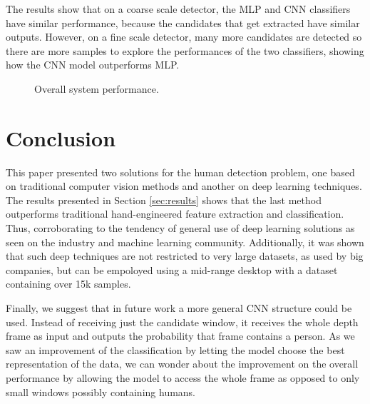    The results show that on a coarse scale detector, the MLP and CNN classifiers have similar performance, because the candidates that get extracted have similar outputs. However, on a fine scale detector, many more candidates are detected so there are more samples to explore the performances of the two classifiers, showing how the CNN model outperforms MLP.

    \begin{figure*}[!t]
    \centering
    \label{fig:result-system-all}
    \hfil
    \label{fig:result-system-all-zoom}
    \caption{Overall system performance.}
    \label{fig:result-system}
    \end{figure*}

\section{Conclusion}
\label{sec:conclusion}

    This paper presented two solutions for the human detection problem, one based on traditional computer vision methods and another on deep learning techniques. The results presented in Section \ref{sec:results} shows that the last method outperforms traditional hand-engineered feature extraction and classification. Thus, corroborating to the tendency of general use of deep learning solutions as seen on the industry and machine learning community. Additionally, it was shown that such deep techniques are not restricted to very large datasets, as used by big companies, but can be empoloyed using a mid-range desktop with a dataset containing over 15k samples.

    Finally, we suggest that in future work a more general CNN structure could be used. Instead of receiving just the candidate window, it receives the whole depth frame as input and outputs the probability that frame contains a person. As we saw an improvement of the classification by letting the model choose the best representation of the data, we can wonder about the improvement on the overall performance by allowing the model to access the whole frame as opposed to only small windows possibly containing humans.
